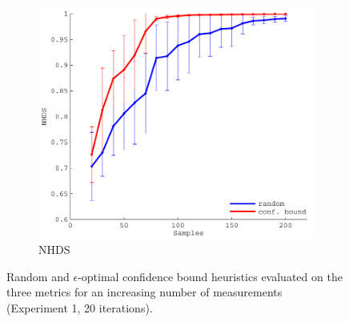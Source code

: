 \documentclass[11pt]{article} %
\begin{document}
\begin{figure}[tb]
  \hfill
  \begin{subfigure}[b]{0.329\textwidth}
    \centering
    \includegraphics[width=\textwidth]{figures/sin2d_eps_hd}
    \caption{NHDS}
  \end{subfigure}
  \caption{Random and $\epsilon$-optimal confidence bound heuristics evaluated
           on the three metrics for an increasing number of measurements
           (Experiment 1, 20 iterations).}
  \label{fig:sin2d_eval_eps}
\end{figure}
\end{document}
